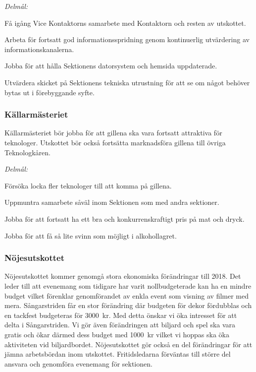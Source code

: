 \documentclass[10pt]{article}
\begin{document}
\emph{Delmål:}
\begin{dashlist}
    \item Få igång Vice Kontaktorns samarbete med Kontaktorn och resten av utskottet.
    \item Arbeta för fortsatt god informationsspridning genom kontinuerlig utvärdering av informationskanalerna.
    \item Jobba för att hålla Sektionens datorsystem och hemsida uppdaterade.
    \item Utvärdera skicket på Sektionens tekniska utrustning för att se om något behöver bytas ut i förebyggande syfte.
\end{dashlist}

\subsubsection*{Källarmästeriet}
Källarmästeriet bör jobba för att gillena ska vara fortsatt attraktiva för teknologer. Utskottet bör också fortsätta marknadsföra gillena till övriga Teknologkåren.

\emph{Delmål:}
\begin{dashlist}
    \item Försöka locka fler teknologer till att komma på gillena.
    \item Uppmuntra samarbete såväl inom Sektionen som med andra sektioner.
    \item Jobba för att fortsatt ha ett bra och konkurrenskraftigt pris på mat och dryck.
    \item Jobba för att få så lite svinn som möjligt i alkohollagret.
\end{dashlist}

\subsubsection*{Nöjesutskottet}
Nöjesutskottet kommer genomgå stora ekonomiska förändringar till 2018. Det leder till att evenemang som tidigare har varit nollbudgeterade kan ha en mindre budget vilket förenklar genomförandet av enkla event som visning av filmer med mera. Sångarstriden får en stor förändring där budgeten för dekor fördubblas och en tackfest budgeteras för \SI{3000}{kr}. Med detta önskar vi öka intresset för att delta i Sångarstriden. Vi gör även förändringen att biljard och spel ska vara gratis och ökar därmed dess budget med \SI{1000}{kr} vilket vi hoppas ska öka aktiviteten vid biljardbordet. Nöjesutskottet gör också en del förändringar för att jämna arbetsbördan inom utskottet. Fritidsledarna förväntas till större del ansvara och genomföra evenemang för sektionen.
\end{document}
